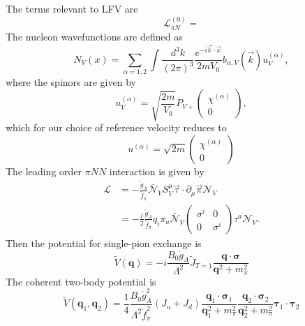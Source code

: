 \documentclass{book}[12pt]
\begin{document}
The terms relevant to LFV are 
\begin{equation}
\mathcal{L}^{(0)}_{\pi N}=
\end{equation}
The nucleon wavefunctions are defined as
\begin{equation}
N_V(x)=\sum_{\alpha=1,2}\int \frac{d^3k}{(2\pi)^3}\frac{e^{-i\vec{k}\cdot\vec{x}}}{2mV_0}b_{\alpha,V}(\vec{k})u_V^{(\alpha)},
\end{equation}
where the spinors are given by
\begin{equation}
u_V^{(\alpha)}=\sqrt{\frac{2m}{V_0}}P_{V+}\left(\begin{array}{c}
\chi^{(\alpha)}\\
0
\end{array}\right),
\end{equation}
which for our choice of reference velocity reduces to 
\begin{equation}
u^{(\alpha)}=\sqrt{2m}\left(\begin{array}{c}
\chi^{(\alpha)}\\
0
\end{array}\right)
\end{equation}
The leading order $\pi NN$ interaction is given by
\begin{equation}
\begin{split}
\mathcal{L}&=-\frac{\mathring{g}_A}{\mathring{f}_{\pi}}\bar{\mathcal{N}}_V S^{\mu}_V\vec{\tau}\cdot\partial_{\mu}\vec{\pi}\mathcal{N}_V\\
&=-\frac{i}{2}\frac{\mathring{g}_A}{\mathring{f}_{\pi}}q_i\pi_a\bar{\mathcal{N}}_V\left(\begin{array}{cc}
\sigma^i & 0 \\
0 & \sigma^i
\end{array}\right)\tau^a\mathcal{N}_V.
\end{split}
\end{equation}
Then the potential for single-pion exchange is
\begin{equation}
\tilde{V}(\mathbf{q})=-i\frac{B_0\mathring{g}_A}{\Lambda^2}\tilde{J}_{T=1}\frac{\mathbf{q}\cdot\boldsymbol\sigma}{\mathbf{q}^2+m_{\pi}^2}
\end{equation}
The coherent two-body potential is
\begin{equation}
\tilde{V}(\mathbf{q}_1,\mathbf{q}_2)=\frac{1}{4}\frac{B_0\mathring{g}_A^2}{\Lambda^2 \mathring{f}_{\pi}^2}\left(J_u+J_d\right)\frac{\mathbf{q}_1\cdot\boldsymbol\sigma_1}{\mathbf{q}_1^2+m_{\pi}^2}\frac{\mathbf{q}_2\cdot\boldsymbol\sigma_2}{\mathbf{q}_2^2+m_{\pi}^2}\boldsymbol\tau_1\cdot\boldsymbol\tau_2
\end{equation}
\end{document}
